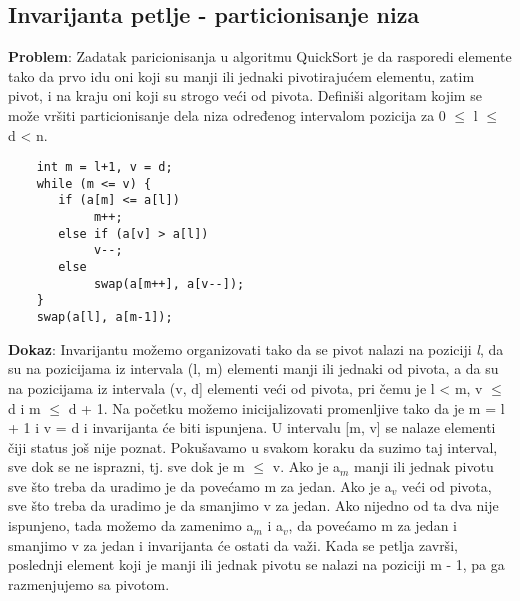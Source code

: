\documentclass{article}
\begin{document}
\subsection{Invarijanta petlje - particionisanje niza}
\textbf{Problem}: Zadatak paricionisanja u algoritmu QuickSort je da rasporedi elemente tako da prvo idu oni koji su manji ili jednaki pivotirajućem elementu, zatim pivot, i na kraju oni koji su strogo veći od pivota. Definiši algoritam kojim se može vršiti particionisanje dela niza određenog intervalom pozicija \newline [l, d] za 0 $\leq$ l $\leq$ d < n.

\begin{lstlisting}
    int m = l+1, v = d; 
    while (m <= v) { 
	   if (a[m] <= a[l]) 
	     	m++; 
	   else if (a[v] > a[l]) 
	    	v--; 
	   else 
     		swap(a[m++], a[v--]); 
	} 
	swap(a[l], a[m-1]);
\end{lstlisting}
\textbf{Dokaz}:
\newline \hspace*{0.8cm}Invarijantu možemo organizovati tako da se pivot nalazi na poziciji \textit{l}, da \hspace*{0.8cm}su na pozicijama iz 	intervala (l, m) elementi manji ili jednaki od pivota, a \hspace*{0.8cm}da su na pozicijama iz intervala (v, d] 	elementi veći od pivota, pri čemu je \hspace*{0.8cm}l < m, v $\leq$ d i m $\leq$ d + 1. Na početku možemo 	inicijalizovati promenljive \hspace*{0.8cm}tako da je m = l + 1 i v = d i invarijanta će biti ispunjena. U 	intervalu \newline \hspace*{0.8cm}[m, v] se nalaze elementi čiji status još nije poznat. Pokušavamo u svakom \hspace*{0.8cm}koraku 	da suzimo taj interval, sve dok se ne isprazni, tj. sve dok je \newline \hspace*{0.8cm}m $\leq$ v. Ako je a$_m$ manji ili jednak 	pivotu sve što treba da uradimo je da \hspace*{0.8cm}povećamo m za jedan. Ako je a$_v$ veći od pivota, sve što 	treba da uradimo \hspace*{0.8cm}je da smanjimo v za jedan. Ako nijedno od ta dva nije ispunjeno, tada \hspace*{0.8cm}možemo da zamenimo a$_m$ i a$_v$, da povećamo m za jedan i smanjimo v \hspace*{0.8cm}za jedan i invarijanta će 	ostati da važi. Kada se petlja završi, poslednji \hspace*{0.8cm}element koji je manji ili jednak pivotu se nalazi 	na poziciji m - 1, pa ga \hspace*{0.8cm}razmenjujemo sa pivotom.
\end{document}
